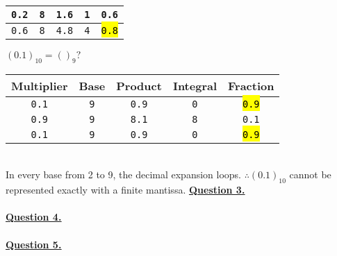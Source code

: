 \documentclass[12pt]{article}
\begin{document}
\begin{minipage}[t]{0.5\textwidth}
\begin{center}
\begin{tabular}{|c|c|c|c|c|}
			\texttt{0.2} & \texttt{8} & \texttt{1.6} & \texttt{1} & \texttt{0.6} \\\hline
			\texttt{0.6} & \texttt{8} & \texttt{4.8} & \texttt{4} & \hl{\texttt{0.8}} \\\hline
		\end{tabular}
	\end{center}
	$(0.1)_{10} = ()_9?$
	\begin{center}
		\begin{tabular}{|c|c|c|c|c|}
			\hline \cellcolor{gray!25}Multiplier &
			\cellcolor{gray!25}Base &
			\cellcolor{gray!25}Product &
			\cellcolor{gray!25}Integral &
			\cellcolor{gray!25}Fraction \\
			\hline\hline
			\texttt{0.1} & \texttt{9} & \texttt{0.9} & \texttt{0} & \hl{\texttt{0.9}} \\\hline
			\texttt{0.9} & \texttt{9} & \texttt{8.1} & \texttt{8} & \texttt{0.1} \\\hline
			\texttt{0.1} & \texttt{9} & \texttt{0.9} & \texttt{0} & \hl{\texttt{0.9}} \\\hline
		\end{tabular}
	\end{center}
\end{minipage}\\

In every base from 2 to 9, the decimal expansion loops. $\therefore (0.1)_{10}$ cannot be represented exactly with a finite mantissa.
\newpage
\noindent \hyperlink{toc}{\hypertarget{3}{\LARGE \underline{\textbf{Question 3.}}}}\\\\
\newpage
\noindent \hyperlink{toc}{\hypertarget{4}{\LARGE \underline{\textbf{Question 4.}}}}\\\\
\newpage
\noindent \hyperlink{toc}{\hypertarget{5}{\LARGE \underline{\textbf{Question 5.}}}}\\\\
\end{document}
